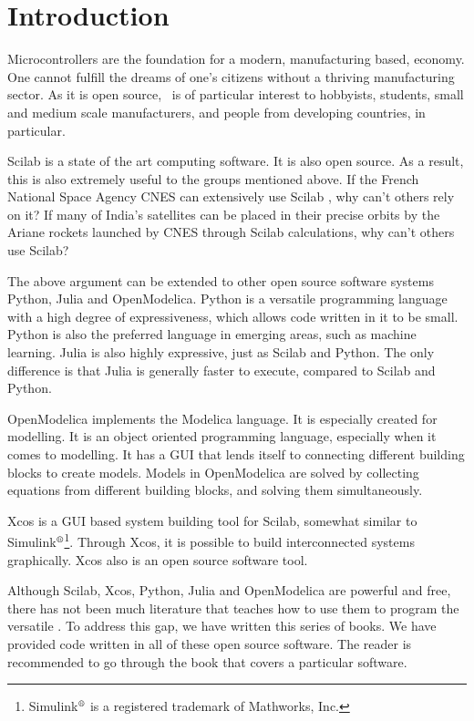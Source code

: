 \chapter{Introduction}
\thispagestyle{empty}
\label{sec:intro}
Microcontrollers are the foundation for a modern, manufacturing based,
economy.  One cannot fulfill the dreams of one's citizens without a
thriving manufacturing sector.  As it is open source, \arduino\ is of
particular interest to hobbyists, students, small and medium scale
manufacturers, and people from developing countries, in particular.

Scilab is a state of the art computing software.  It is also open
source.  As a result, this is also extremely useful to the groups
mentioned above.  If the French National Space Agency CNES can
extensively use Scilab \cite{CNES-Scilab}, why can't others rely on
it?  If many of India's satellites can be placed in their precise
orbits by the Ariane rockets launched by CNES through Scilab
calculations, why can't others use Scilab?

The above argument can be extended to other open source software
systems Python, Julia and OpenModelica.  Python is a versatile
programming language with a high degree of expressiveness, which
allows code written in it to be small.  Python is also the preferred
language in emerging areas, such as machine learning.  Julia is also
highly expressive, just as Scilab and Python.  The only difference is
that Julia is generally faster to execute, compared to Scilab and
Python.

OpenModelica implements the Modelica language.  It is especially
created for modelling. It is an object oriented programming language,
especially when it comes to modelling.  It has a GUI that lends itself
to connecting different building blocks to create models.  Models in
OpenModelica are solved by collecting equations from different
building blocks, and solving them simultaneously.

Xcos is a GUI based system building tool for Scilab, somewhat similar
to
Simulink$^{\text{\textregistered}}$\footnote{Simulink$^{\text{\textregistered}}$
is a registered trademark of Mathworks, Inc.}.  Through Xcos, it is
possible to build interconnected systems graphically.  Xcos also is an
open source software tool.

Although Scilab, Xcos, Python, Julia and OpenModelica are powerful and
free, there has not been much literature that teaches how to use them
to program the versatile \arduino.  To address this gap, we have
written this series of books.  We have provided code written in all of
these open source software.  The reader is recommended to go through
the book that covers a particular software.

